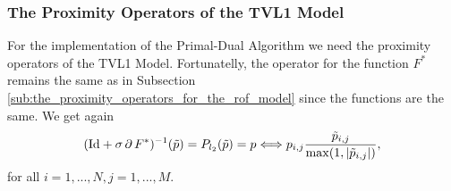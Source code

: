 
    \subsubsection{The Proximity Operators of the TVL1 Model} %
    \label{ssub:the_proximity_operators_of_the_tvl1_model}
        
        For the implementation of the Primal-Dual Algorithm we need the proximity operators of the TVL1 Model. Fortunatelly, the operator for the function $F^{\ast}$ remains the same as in Subsection \ref{sub:the_proximity_operators_for_the_rof_model} since the functions are the same. We get again
            \begin{equation}
                (\textnormal{Id} + \sigma\,\partial\,F^{\ast})^{-1}(\tilde{p}) = P_{l_{2}}(\tilde{p}) = p \Longleftrightarrow p_{i,j} \frac{\tilde{p}_{i, j}}{\max(1, |\tilde{p}_{i, j}|)},
            \label{eq:proximity_operator_f_star_tvl1}
            \end{equation}
        for all $i = 1, ..., N, j = 1, ..., M$.

